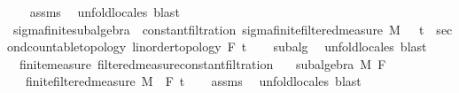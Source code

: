 \begin{isabellebody}
%
\isadelimproof
\ \ %
\endisadelimproof
%
\isatagproof
{}\isamarkupfalse%
\ assms\ \isamarkupfalse%
\ {\isacharparenleft}{\kern0pt}unfold{\isacharunderscore}{\kern0pt}locales{\isacharparenright}{\kern0pt}\ blast{\isacharplus}{\kern0pt}%
\endisatagproof
{\isafoldproof}%
%
\isadelimproof
\isanewline
%
\endisadelimproof
\isanewline
{}\isamarkupfalse%
\ sigma{\isacharunderscore}{\kern0pt}finite{\isacharunderscore}{\kern0pt}subalgebra\ {\isasymsubseteq}\ constant{\isacharunderscore}{\kern0pt}filtration{\isacharcolon}{\kern0pt}\ sigma{\isacharunderscore}{\kern0pt}finite{\isacharunderscore}{\kern0pt}filtered{\isacharunderscore}{\kern0pt}measure\ M\ {\isachardoublequoteopen}{\isasymlambda}{\isacharunderscore}{\kern0pt}\ {\isacharcolon}{\kern0pt}{\isacharcolon}{\kern0pt}\ {\isacharprime}{\kern0pt}t\ {\isacharcolon}{\kern0pt}{\isacharcolon}{\kern0pt}\ {\isacharbraceleft}{\kern0pt}second{\isacharunderscore}{\kern0pt}countable{\isacharunderscore}{\kern0pt}topology{\isacharcomma}{\kern0pt}\ linorder{\isacharunderscore}{\kern0pt}topology{\isacharbraceright}{\kern0pt}{\isachardot}{\kern0pt}\ F{\isachardoublequoteclose}\ t\isanewline
%
\isadelimproof
\ \ %
\endisadelimproof
%
\isatagproof
{}\isamarkupfalse%
\ subalg\ \isamarkupfalse%
\ {\isacharparenleft}{\kern0pt}unfold{\isacharunderscore}{\kern0pt}locales{\isacharparenright}{\kern0pt}\ blast{\isacharplus}{\kern0pt}%
\endisatagproof
{\isafoldproof}%
%
\isadelimproof
\isanewline
%
\endisadelimproof
\isanewline
{}\isamarkupfalse%
\ {\isacharparenleft}{\kern0pt}\ finite{\isacharunderscore}{\kern0pt}measure{\isacharparenright}{\kern0pt}\ filtered{\isacharunderscore}{\kern0pt}measure{\isacharunderscore}{\kern0pt}constant{\isacharunderscore}{\kern0pt}filtration{\isacharcolon}{\kern0pt}\isanewline
\ \ \ {\isachardoublequoteopen}subalgebra\ M\ F{\isachardoublequoteclose}\isanewline
\ \ \ {\isachardoublequoteopen}finite{\isacharunderscore}{\kern0pt}filtered{\isacharunderscore}{\kern0pt}measure\ M\ {\isacharparenleft}{\kern0pt}{\isasymlambda}{\isacharunderscore}{\kern0pt}{\isachardot}{\kern0pt}\ F{\isacharparenright}{\kern0pt}\ t\isanewline
%
\isadelimproof
\ \ %
\endisadelimproof
%
\isatagproof
{}\isamarkupfalse%
\ assms\ \isamarkupfalse%
\ {\isacharparenleft}{\kern0pt}unfold{\isacharunderscore}{\kern0pt}locales{\isacharparenright}{\kern0pt}\ blast{\isacharplus}{\kern0pt}%
\endisatagproof
{\isafoldproof}%
%
\isadelimproof
\isanewline
%
\endisadelimproof
%
\isadelimtheory
\isanewline
%
\endisadelimtheory
%
\isatagtheory
{}\isamarkupfalse%
%
\endisatagtheory
{\isafoldtheory}%
%
\isadelimtheory
%
\endisadelimtheory
%
\end{isabellebody}%
